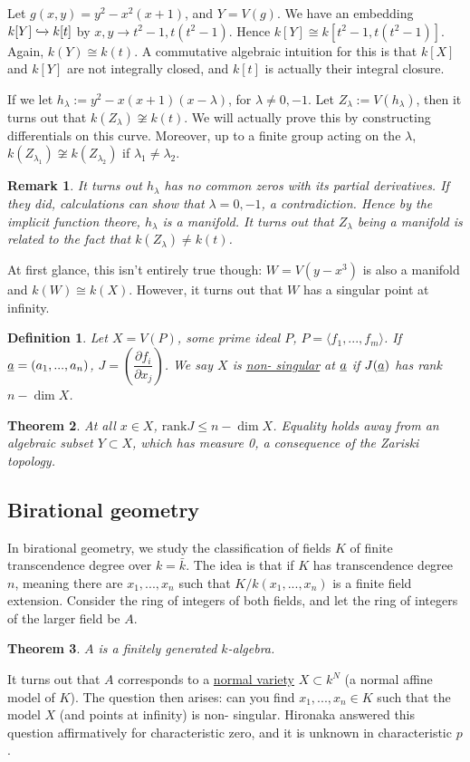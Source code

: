 \documentclass[letterpaper, 12pt]{article}
\newtheorem{rmk}{Remark}
\newtheorem{thm}{Theorem}[subsection]
\newtheorem{definition}[thm]{Definition}
\newcommand{\iso}{\cong}
\begin{document}
Let $g(x,y) = y^2 - x^2(x + 1)$, and $Y = V(g)$. We have an embedding $k[Y]
\xhookrightarrow{} k[t]$ by $x, y \rightarrow t^2 - 1, t(t^2 - 1)$. Hence
$k[Y] \iso k[t^2 - 1, t(t^2 - 1)]$. Again, $k(Y) \iso k(t)$. A commutative
algebraic intuition for this is that $k[X]$ and $k[Y]$ are not integrally
closed, and $k[t]$ is actually their integral closure.

If we let $h_\lambda := y^2 - x(x + 1)(x - \lambda)$, for $\lambda \neq 0,
-1$. Let $Z_\lambda := V(h_\lambda)$, then it turns out that $k(Z_\lambda)
\not \iso k(t)$. We will actually prove this by constructing differentials on
this curve. Moreover, up to a finite group acting on the $\lambda$,
$k(Z_{\lambda_1}) \not \iso k(Z_{\lambda_2})$ if $\lambda_1 \neq \lambda_2$.

\begin{rmk} It turns out $h_\lambda$ has no common zeros with its partial
derivatives. If they did, calculations can show that $\lambda = 0, -1$, a
contradiction. Hence by the implicit function theore, $h_\lambda$ is a
manifold. It turns out that $Z_\lambda$ being a manifold is related to the
fact that $k(Z_\lambda) \neq k(t)$. \end{rmk}

At first glance, this isn't entirely true though: $W = V(y - x^3)$ is also a
manifold and $k(W) \iso k(X)$. However, it turns out that $W$ has a singular
point at infinity.

\begin{definition}   Let $X = V(P)$, some prime ideal $P$, $P = \langle f_1,
..., f_m \rangle$. If $\uline{a} = (a_1, ..., a_n)$, $J = \left(
\dfrac{\partial f_i}{\partial x_j} \right)$. We say $X$ is \uline{non-
singular} at $\uline{a}$ if $J(\uline{a})$ has rank $n - \dim X$.
\end{definition}

\begin{thm} At all $x \in X$, $\mathrm{rank} J \leq n - \dim X$. Equality
holds away from an algebraic subset $Y \subset X$, which has measure 0, a
consequence of the Zariski topology. \end{thm}

\subsection{Birational geometry} In birational geometry, we study the
classification of fields $K$ of finite transcendence degree over $k =
\bar{k}$. The idea is that if $K$ has transcendence degree $n$, meaning there
are $x_1, ..., x_n$ such that $K/k(x_1, ..., x_n)$ is a finite field
extension. Consider the ring of integers of both fields, and let the ring of
integers of the larger field be $A$.

\begin{thm} $A$ is a finitely generated $k$-algebra. \end{thm}

It turns out that $A$ corresponds to a \uline{normal variety} $X \subset k^N$
(a normal affine model of $K$). The question then arises: can you find $x_1,
..., x_n \in K$ such that the model $X$ (and points at infinity) is non-
singular. Hironaka answered this question affirmatively for characteristic
zero, and it is unknown in characteristic $p$.
\end{document}
